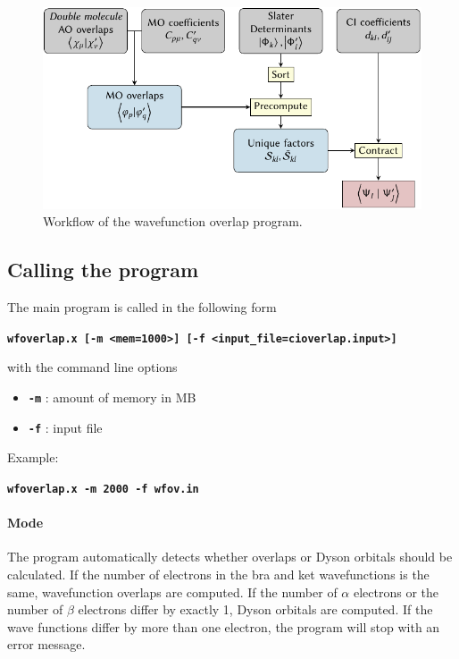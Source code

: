 \documentclass[a4paper,10pt,DIV=15,openany]{scrbook}
\newcommand{\ttt}[1]{\textbf{\texttt{#1}}}
\newenvironment{example}{
  \setlength{\OuterFrameSep}{3pt}
  \vspace{0mm}
  \definecolor{shadecolor}{HTML}{E4F4FF}
  \begin{shaded}
}{
  \end{shaded}
}
\begin{document}
\begin{figure}[htb]
  \centering
  \includegraphics[scale=1]{img/wfoverlap/wfoverlap.pdf}
  \caption{Workflow of the wavefunction overlap program.}
  \label{fig:work}
\end{figure}



\subsection{Calling the program}
The main program is called in the following form
%
\begin{example}
\ttt{wfoverlap.x [-m <mem=1000>] [-f <input\_file=cioverlap.input>]}
\end{example}
%
with the command line options
%
\begin{itemize}
\item \ttt{-m} : amount of memory in MB
\item \ttt{-f} : input file
\end{itemize}

Example:
\begin{example}
\ttt{wfoverlap.x -m 2000 -f wfov.in}
\end{example}

\paragraph{Mode}

The program automatically detects whether overlaps or Dyson orbitals should be calculated.
If the number of electrons in the bra and ket wavefunctions is the same, wavefunction overlaps are computed.
If the number of $\alpha$ electrons or the number of $\beta$ electrons differ by exactly 1, Dyson orbitals are computed.
If the wave functions differ by more than one electron, the program will stop with an error message.
\end{document}
